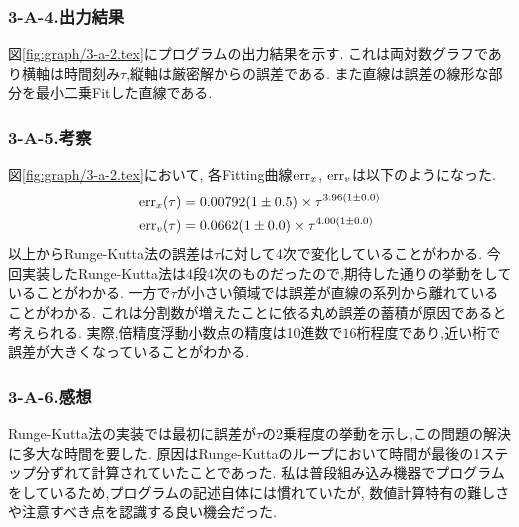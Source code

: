 \subsubsection*{3-A-4.出力結果}
図\ref{fig:graph/3-a-2.tex}にプログラムの出力結果を示す.
これは両対数グラフであり横軸は時間刻み$\tau$,縦軸は厳密解からの誤差である.
また直線は誤差の線形な部分を最小二乗Fitした直線である.
\subsubsection*{3-A-5.考察}
図\ref{fig:graph/3-a-2.tex}において,
各Fitting曲線${\rm err}_x$, ${\rm err}_v$は以下のようになった.
\begin{align}
  {\rm err}_x(\tau)&=0.00792(1\pm0.5)\times \tau^{3.96(1\pm0.0)}\\
  {\rm err}_v(\tau)&=0.0662(1\pm0.0)\times \tau^{4.00(1\pm0.0)}
\end{align}
以上からRunge-Kutta法の誤差は$\tau$に対して4次で変化していることがわかる.
今回実装したRunge-Kutta法は4段4次のものだったので,期待した通りの挙動をしていることがわかる.
一方で$\tau$が小さい領域では誤差が直線の系列から離れていることがわかる.
これは分割数が増えたことに依る丸め誤差の蓄積が原因であると考えられる.
実際,倍精度浮動小数点の精度は10進数で$16$桁程度であり,近い桁で誤差が大きくなっていることがわかる.
\subsubsection*{3-A-6.感想}
Runge-Kutta法の実装では最初に誤差が$\tau$の2乗程度の挙動を示し,この問題の解決に多大な時間を要した.
原因はRunge-Kuttaのループにおいて時間が最後の1ステップ分ずれて計算されていたことであった.
私は普段組み込み機器でプログラムをしているため,プログラムの記述自体には慣れていたが,
数値計算特有の難しさや注意すべき点を認識する良い機会だった.